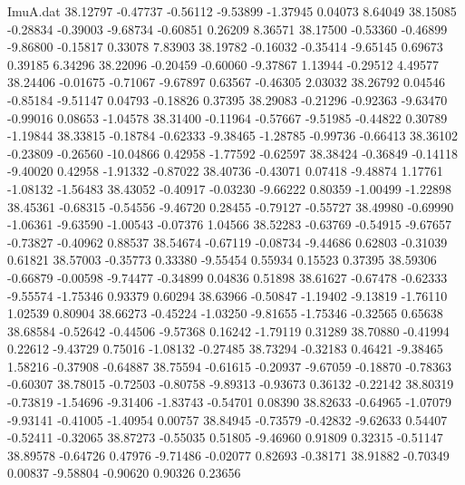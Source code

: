 \begin{filecontents}{ImuA.dat}
  38.12797   -0.47737   -0.56112   -9.53899   -1.37945    0.04073    8.64049
  38.15085   -0.28834   -0.39003   -9.68734   -0.60851    0.26209    8.36571
  38.17500   -0.53360   -0.46899   -9.86800   -0.15817    0.33078    7.83903
  38.19782   -0.16032   -0.35414   -9.65145    0.69673    0.39185    6.34296
  38.22096   -0.20459   -0.60060   -9.37867    1.13944   -0.29512    4.49577
  38.24406   -0.01675   -0.71067   -9.67897    0.63567   -0.46305    2.03032
  38.26792    0.04546   -0.85184   -9.51147    0.04793   -0.18826    0.37395
  38.29083   -0.21296   -0.92363   -9.63470   -0.99016    0.08653   -1.04578
  38.31400   -0.11964   -0.57667   -9.51985   -0.44822    0.30789   -1.19844
  38.33815   -0.18784   -0.62333   -9.38465   -1.28785   -0.99736   -0.66413
  38.36102   -0.23809   -0.26560  -10.04866    0.42958   -1.77592   -0.62597
  38.38424   -0.36849   -0.14118   -9.40020    0.42958   -1.91332   -0.87022
  38.40736   -0.43071    0.07418   -9.48874    1.17761   -1.08132   -1.56483
  38.43052   -0.40917   -0.03230   -9.66222    0.80359   -1.00499   -1.22898
  38.45361   -0.68315   -0.54556   -9.46720    0.28455   -0.79127   -0.55727
  38.49980   -0.69990   -1.06361   -9.63590   -1.00543   -0.07376    1.04566
  38.52283   -0.63769   -0.54915   -9.67657   -0.73827   -0.40962    0.88537
  38.54674   -0.67119   -0.08734   -9.44686    0.62803   -0.31039    0.61821
  38.57003   -0.35773    0.33380   -9.55454    0.55934    0.15523    0.37395
  38.59306   -0.66879   -0.00598   -9.74477   -0.34899    0.04836    0.51898
  38.61627   -0.67478   -0.62333   -9.55574   -1.75346    0.93379    0.60294
  38.63966   -0.50847   -1.19402   -9.13819   -1.76110    1.02539    0.80904
  38.66273   -0.45224   -1.03250   -9.81655   -1.75346   -0.32565    0.65638
  38.68584   -0.52642   -0.44506   -9.57368    0.16242   -1.79119    0.31289
  38.70880   -0.41994    0.22612   -9.43729    0.75016   -1.08132   -0.27485
  38.73294   -0.32183    0.46421   -9.38465    1.58216   -0.37908   -0.64887
  38.75594   -0.61615   -0.20937   -9.67059   -0.18870   -0.78363   -0.60307
  38.78015   -0.72503   -0.80758   -9.89313   -0.93673    0.36132   -0.22142
  38.80319   -0.73819   -1.54696   -9.31406   -1.83743   -0.54701    0.08390
  38.82633   -0.64965   -1.07079   -9.93141   -0.41005   -1.40954    0.00757
  38.84945   -0.73579   -0.42832   -9.62633    0.54407   -0.52411   -0.32065
  38.87273   -0.55035    0.51805   -9.46960    0.91809    0.32315   -0.51147
  38.89578   -0.64726    0.47976   -9.71486   -0.02077    0.82693   -0.38171
  38.91882   -0.70349    0.00837   -9.58804   -0.90620    0.90326    0.23656

\end{filecontents}
